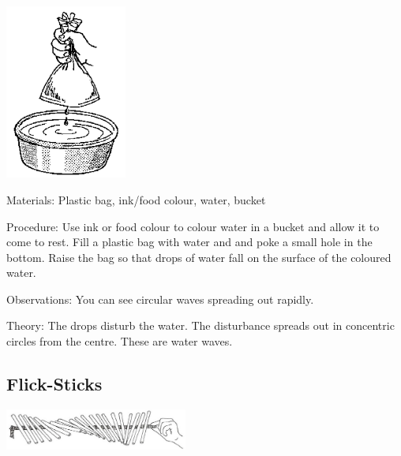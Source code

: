 \begin{multicols}{2}
\begin{center}
\includegraphics[width=0.3\textwidth]{./img/source/water-waves.png}
\end{center}

\begin{description*}
\item[Materials:]{Plastic bag, ink/food colour, water, bucket}
\item[Procedure:]{Use ink or food colour to colour water in a bucket and allow it to come to rest. Fill a plastic bag with water and and poke a small hole in the bottom. Raise the bag so that drops of water fall on the surface of the coloured water.}
\item[Observations:]{You can see circular waves spreading out rapidly.}
\item[Theory:]{The drops disturb the water. The disturbance spreads out in concentric circles from the centre. These are water waves.}
\end{description*}

\subsection{Flick-Sticks}

\begin{center}
\includegraphics[width=0.45\textwidth]{./img/vso/flick-sticks.png}
\end{center}


\end{multicols}
